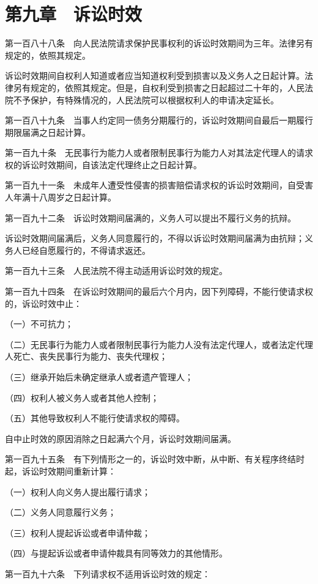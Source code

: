 \documentclass[UTF8,12pt,a4paper]{ctexbook}
\begin{document}
\section*{第九章　诉讼时效}

第一百八十八条　向人民法院请求保护民事权利的诉讼时效期间为三年。法律另有规定的，依照其规定。

诉讼时效期间自权利人知道或者应当知道权利受到损害以及义务人之日起计算。法律另有规定的，依照其规定。但是，自权利受到损害之日起超过二十年的，人民法院不予保护，有特殊情况的，人民法院可以根据权利人的申请决定延长。

第一百八十九条　当事人约定同一债务分期履行的，诉讼时效期间自最后一期履行期限届满之日起计算。

第一百九十条　无民事行为能力人或者限制民事行为能力人对其法定代理人的请求权的诉讼时效期间，自该法定代理终止之日起计算。

第一百九十一条　未成年人遭受性侵害的损害赔偿请求权的诉讼时效期间，自受害人年满十八周岁之日起计算。

第一百九十二条　诉讼时效期间届满的，义务人可以提出不履行义务的抗辩。

诉讼时效期间届满后，义务人同意履行的，不得以诉讼时效期间届满为由抗辩；义务人已经自愿履行的，不得请求返还。

第一百九十三条　人民法院不得主动适用诉讼时效的规定。

第一百九十四条　在诉讼时效期间的最后六个月内，因下列障碍，不能行使请求权的，诉讼时效中止：

（一）不可抗力；

（二）无民事行为能力人或者限制民事行为能力人没有法定代理人，或者法定代理人死亡、丧失民事行为能力、丧失代理权；

（三）继承开始后未确定继承人或者遗产管理人；

（四）权利人被义务人或者其他人控制；

（五）其他导致权利人不能行使请求权的障碍。

自中止时效的原因消除之日起满六个月，诉讼时效期间届满。

第一百九十五条　有下列情形之一的，诉讼时效中断，从中断、有关程序终结时起，诉讼时效期间重新计算：

（一）权利人向义务人提出履行请求；

（二）义务人同意履行义务；

（三）权利人提起诉讼或者申请仲裁；

（四）与提起诉讼或者申请仲裁具有同等效力的其他情形。

第一百九十六条　下列请求权不适用诉讼时效的规定：
\end{document}
